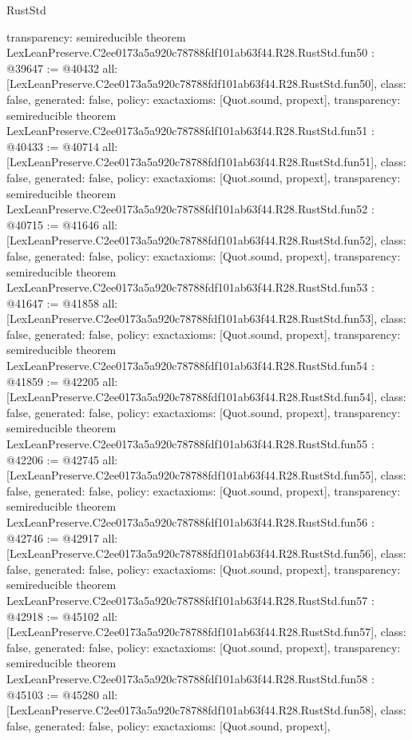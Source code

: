 \begin{lexlean}{RustStd}
\begin{coremodule}
{  transparency: semireducible
}
theorem LexLeanPreserve.C2ee0173a5a920c78788fdf101ab63f44.R28.RustStd.fun50 : @39647 := @40432 {
  all: [LexLeanPreserve.C2ee0173a5a920c78788fdf101ab63f44.R28.RustStd.fun50],
  class: false,
  generated: false,
  policy: exact{axioms: [Quot.sound, propext]},
  transparency: semireducible
}
theorem LexLeanPreserve.C2ee0173a5a920c78788fdf101ab63f44.R28.RustStd.fun51 : @40433 := @40714 {
  all: [LexLeanPreserve.C2ee0173a5a920c78788fdf101ab63f44.R28.RustStd.fun51],
  class: false,
  generated: false,
  policy: exact{axioms: [Quot.sound, propext]},
  transparency: semireducible
}
theorem LexLeanPreserve.C2ee0173a5a920c78788fdf101ab63f44.R28.RustStd.fun52 : @40715 := @41646 {
  all: [LexLeanPreserve.C2ee0173a5a920c78788fdf101ab63f44.R28.RustStd.fun52],
  class: false,
  generated: false,
  policy: exact{axioms: [Quot.sound, propext]},
  transparency: semireducible
}
theorem LexLeanPreserve.C2ee0173a5a920c78788fdf101ab63f44.R28.RustStd.fun53 : @41647 := @41858 {
  all: [LexLeanPreserve.C2ee0173a5a920c78788fdf101ab63f44.R28.RustStd.fun53],
  class: false,
  generated: false,
  policy: exact{axioms: [Quot.sound, propext]},
  transparency: semireducible
}
theorem LexLeanPreserve.C2ee0173a5a920c78788fdf101ab63f44.R28.RustStd.fun54 : @41859 := @42205 {
  all: [LexLeanPreserve.C2ee0173a5a920c78788fdf101ab63f44.R28.RustStd.fun54],
  class: false,
  generated: false,
  policy: exact{axioms: [Quot.sound, propext]},
  transparency: semireducible
}
theorem LexLeanPreserve.C2ee0173a5a920c78788fdf101ab63f44.R28.RustStd.fun55 : @42206 := @42745 {
  all: [LexLeanPreserve.C2ee0173a5a920c78788fdf101ab63f44.R28.RustStd.fun55],
  class: false,
  generated: false,
  policy: exact{axioms: [Quot.sound, propext]},
  transparency: semireducible
}
theorem LexLeanPreserve.C2ee0173a5a920c78788fdf101ab63f44.R28.RustStd.fun56 : @42746 := @42917 {
  all: [LexLeanPreserve.C2ee0173a5a920c78788fdf101ab63f44.R28.RustStd.fun56],
  class: false,
  generated: false,
  policy: exact{axioms: [Quot.sound, propext]},
  transparency: semireducible
}
theorem LexLeanPreserve.C2ee0173a5a920c78788fdf101ab63f44.R28.RustStd.fun57 : @42918 := @45102 {
  all: [LexLeanPreserve.C2ee0173a5a920c78788fdf101ab63f44.R28.RustStd.fun57],
  class: false,
  generated: false,
  policy: exact{axioms: [Quot.sound, propext]},
  transparency: semireducible
}
theorem LexLeanPreserve.C2ee0173a5a920c78788fdf101ab63f44.R28.RustStd.fun58 : @45103 := @45280 {
  all: [LexLeanPreserve.C2ee0173a5a920c78788fdf101ab63f44.R28.RustStd.fun58],
  class: false,
  generated: false,
  policy: exact{axioms: [Quot.sound, propext]},
}
\end{coremodule}
\end{lexlean}
